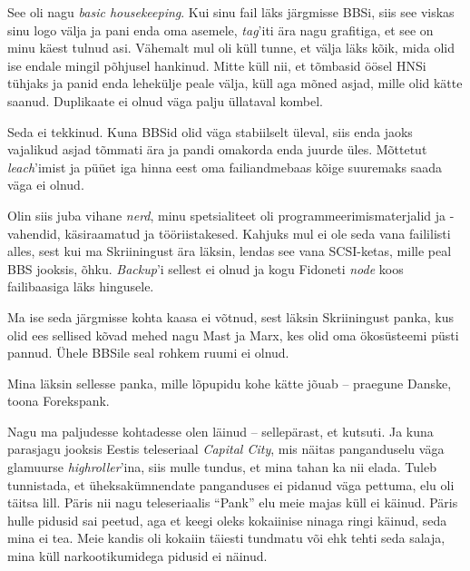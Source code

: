 See oli nagu \emph{basic housekeeping}. Kui sinu fail läks 
järgmisse BBSi, siis see viskas sinu logo välja ja pani enda oma 
asemele, \emph{tag}'iti ära nagu grafitiga, et see on 
minu käest tulnud asi. Vähemalt mul oli küll tunne, et välja läks 
kõik, mida olid ise endale mingil põhjusel hankinud. Mitte küll nii, et 
tõmbasid öösel HNSi tühjaks ja 
panid enda lehekülje peale välja, küll aga mõned asjad, mille olid kätte 
saanud. Duplikaate ei olnud väga palju üllataval kombel.


Seda ei tekkinud. Kuna BBSid olid väga stabiilselt üleval, siis enda jaoks 
vajalikud asjad tõmmati
ära ja pandi omakorda enda juurde üles. Mõttetut \emph{leach}'imist ja püüet 
iga hinna eest oma failiandmebaas kõige suuremaks saada 
väga ei olnud. 


Olin siis juba vihane \emph{nerd}, minu spetsialiteet oli 
programmeerimismaterjalid ja -vahendid, käsiraamatud ja
tööriistakesed. 
Kahjuks mul ei ole seda vana faililisti alles, sest kui ma Skriiningust ära 
läksin, lendas see vana SCSI-ketas, 
mille peal BBS jooksis, õhku. \emph{Backup}'i sellest ei olnud ja 
kogu Fidoneti \emph{node} koos failibaasiga läks hingusele.

Ma ise seda järgmisse kohta kaasa ei võtnud, sest läksin Skriiningust panka, 
kus 
olid ees sellised kõvad mehed nagu Mast ja 
Marx, kes 
olid oma ökosüsteemi püsti pannud. Ühele BBSile seal rohkem ruumi ei olnud. 


Mina läksin sellesse panka, mille lõpupidu kohe 
kätte jõuab -- 
praegune Danske, toona Forekspank. 


Nagu ma paljudesse kohtadesse olen läinud -- sellepärast, et kutsuti. Ja 
kuna parasjagu jooksis Eestis teleseriaal \emph{Capital City}, mis 
näitas panganduselu väga glamuurse \emph{highroller}'ina, siis mulle tundus, 
et mina tahan ka nii elada. Tuleb tunnistada, et üheksakümnendate panganduses  
ei pidanud väga pettuma, elu oli täitsa lill. Päris nii nagu 
teleseriaalis \enquote{Pank} elu meie majas küll ei käinud. 
Päris hulle pidusid sai peetud, aga et keegi oleks kokaiinise  
ninaga ringi käinud, seda mina ei tea. Meie kandis oli kokaiin täiesti 
tundmatu või ehk tehti seda salaja, mina küll
narkootikumidega pidusid ei näinud.

